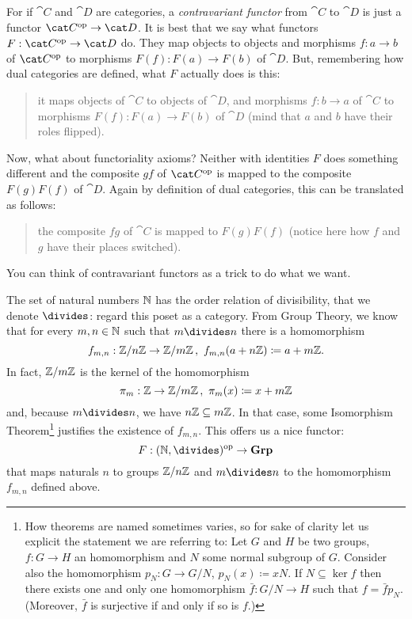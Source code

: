 For if \(\cat C\) and \(\cat D\) are categories, a {\em contravariant functor} from \(\cat C\) to \(\cat D\) is just a functor \(\op{\cat C} \to \cat D\). It is best that we say what functors \(F : \op{\cat C} \to \cat D\) do. They map objects to objects and morphisms \(f : a \to b\) of \(\op{\cat C}\) to morphisms \(F(f) : F(a) \to F(b)\) of \(\cat D\). But, remembering how dual categories are defined, what \(F\) actually does is this:
\begin{quotation}
it maps objects of \(\cat C\) to objects of \(\cat D\), and morphisms \(f : b \to a\) of \(\cat C\) to morphisms \(F(f) : F(a) \to F(b)\) of \(\cat D\) (mind that \(a\) and \(b\) have their roles flipped).
\end{quotation}
Now, what about functoriality axioms? Neither with identities \(F\) does something different and the composite \(gf\) of \(\op{\cat C}\) is mapped to the composite \(F(g)F(f)\) of \(\cat D\). Again by definition of dual categories, this can be translated as follows:
\begin{quotation}
the composite \(fg\) of \(\cat C\) is mapped to \(F(g)F(f)\) (notice here how \(f\) and \(g\) have their places switched).
\end{quotation}
You can think of contravariant functors as a trick to do what we want.

\begin{example}
The set of natural numbers \(\mathbb N\) has the order relation of divisibility, that we denote \(\divides\): regard this poset as a category. From Group Theory, we know that for every \(m, n \in \mathbb N\) such that \(m \divides n\) there is a homomorphism
\[f_{m, n} : \mathbb Z/n\mathbb Z \to \mathbb Z/m\mathbb Z\,,\ f_{m, n}(a +n\mathbb Z) \coloneq a + m\mathbb Z .\]
In fact, \(\mathbb Z/m\mathbb Z\) is the kernel of the homomorphism
\[\pi_m : \mathbb Z \to \mathbb Z/m\mathbb Z\,, \ \pi_m(x) \coloneq x + m\mathbb Z\]
and, because \(m \divides n\), we have \(n\mathbb Z \subseteq m\mathbb Z\). In that case, some Isomorphism Theorem\footnote{How theorems are named sometimes varies, so for sake of clarity let us explicit the statement we are referring to: Let \(G\) and \(H\) be two groups, \(f : G \to H\) an homomorphism and \(N\) some normal subgroup of \(G\). Consider also the homomorphism \(p_N : G \to G/N\), \(p_N(x) \coloneq xN\). If \(N \subseteq \ker f\) then there exists one and only one homomorphism \(\bar f : G/N \to H\) such that
\(f = \bar f p_N\).
(Moreover, \(\bar f\) is surjective if and only if so is \(f\).)} justifies the existence of \(f_{m, n}\).
This offers us a nice functor:
\[F : \op{(\nats, \divides)} \to \Grp\]
that maps naturals \(n\) to groups \(\mathbb Z/n\mathbb Z\) and \(m \divides n\) to the homomorphism \(f_{m,n}\) defined above.
\end{example}


